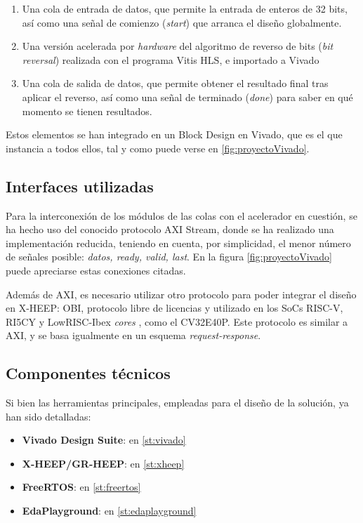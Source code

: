 \begin{enumerate}
    \item Una cola de entrada de datos, que permite la entrada de enteros de 32 bits, así como una señal de comienzo (\emph{start}) que arranca el diseño globalmente.
    \item Una versión acelerada por \textit{hardware} del algoritmo de reverso de bits (\emph{bit reversal}) realizada con el programa Vitis HLS, e importado a Vivado
    \item Una cola de salida de datos, que permite obtener el resultado final tras aplicar el reverso, así como una señal de terminado (\emph{done}) para saber en qué momento se tienen resultados.
\end{enumerate}

Estos elementos se han integrado en un Block Design en Vivado, que es el que instancia a todos ellos, tal y como puede verse en \ref{fig:proyectoVivado}.

\subsection{Interfaces utilizadas}
Para la interconexión de los módulos de las colas con el acelerador en cuestión, se ha hecho uso del conocido protocolo \ac{AXI} Stream, donde se ha realizado una implementación reducida, teniendo en cuenta, por simplicidad, el menor número de señales posible: \emph{datos, ready, valid, last}. En la figura \ref{fig:proyectoVivado} puede apreciarse estas conexiones citadas.

Además de AXI, es necesario utilizar otro protocolo para poder integrar el diseño en X-HEEP: \ac{OBI}, protocolo libre de licencias y utilizado en los SoCs RISC-V, RI5CY y LowRISC-Ibex \textit{cores} \cite{infoOBI}, como el CV32E40P. Este protocolo es similar a AXI, y se basa igualmente en un esquema \emph{request-response}.

\subsection{Componentes técnicos}
Si bien las herramientas principales, empleadas para el diseño de la solución, ya han sido detalladas:

\begin{itemize}
    \item \textbf{Vivado Design Suite}: en \ref{st:vivado}
    \item \textbf{X-HEEP/GR-HEEP}: en \ref{st:xheep}
    \item \textbf{FreeRTOS}: en \ref{st:freertos}
    \item \textbf{EdaPlayground}: en \ref{st:edaplayground}
\end{itemize}

